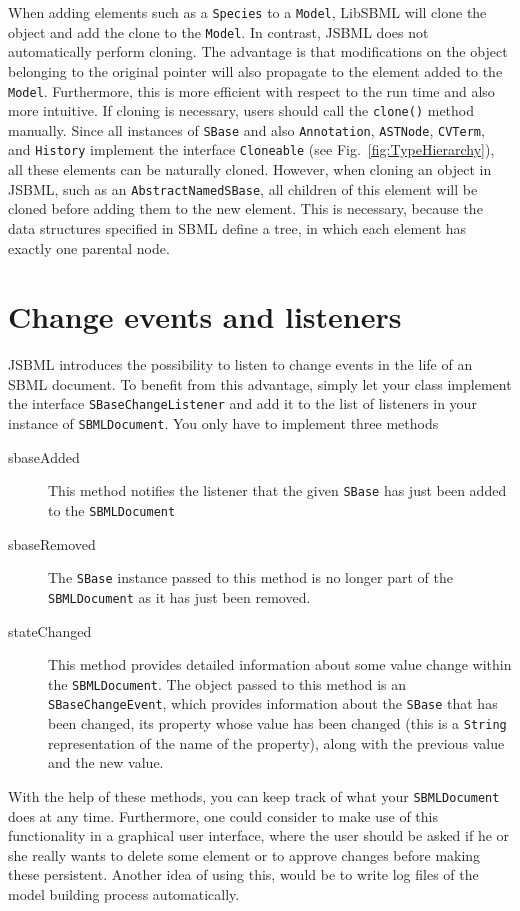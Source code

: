 \documentclass[
  BCOR12mm,
  letterpaper,
  11pt,
  headsepline,
  pointlessnumbers,
  tablecaptionabove,
  headinclude,
  appendixprefix,
  idxtotoc,
  bibtotoc,
  twoside,
  titlepage
]{scrartcl}
\begin{document}
When adding elements such as a \verb!Species! to a \verb!Model!, LibSBML will
clone the object and add the clone to the \verb!Model!. In contrast, JSBML does
not automatically perform cloning. The advantage is that modifications on the
object belonging to the original pointer will also propagate to the element
added to the \verb!Model!. Furthermore, this is more efficient with respect to
the run time and also more intuitive. If cloning is necessary, users should call
the \verb!clone()! method manually. Since all instances of \verb!SBase! and also
\verb!Annotation!, \verb!ASTNode!, \verb!CVTerm!, and \verb!History! implement
the interface \verb!Cloneable! (see Fig.~\vref{fig:TypeHierarchy}), all these
elements can be naturally cloned. However, when cloning an object in JSBML, such
as an \verb!AbstractNamedSBase!, all children of this element will be cloned
before adding them to the new element. This is necessary, because the data
structures specified in SBML define a tree, in which each element has exactly
one parental node.


\section{Change events and listeners}

JSBML introduces the possibility to listen to change events in the life of an
SBML document. To benefit from this advantage, simply let your class implement
the interface \verb!SBaseChangeListener! and add it to the list of listeners in
your instance of  \verb!SBMLDocument!. You only have to implement three methods
\begin{description}
 \item[sbaseAdded] This method notifies the listener that the given \verb!SBase!
   has just been added to the \verb!SBMLDocument!
 \item[sbaseRemoved] The \verb!SBase! instance passed to this method is no
   longer part of the \verb!SBMLDocument! as it has just been removed.
 \item[stateChanged] This method provides detailed information about some value
   change within the \verb!SBMLDocument!. The object passed to this method is
   an \verb!SBaseChangeEvent!, which provides information about the \verb!SBase!
   that has been changed, its property whose value has been changed (this is a
   \verb!String! representation of the name of the property), along with the
   previous value and the new value.
\end{description}
With the help of these methods, you can keep track of what your
\verb!SBMLDocument! does at any time. Furthermore, one could consider to make
use of this functionality in a graphical user interface, where the user should
be asked if he or she really wants to delete some element or to approve changes
before making these persistent. Another idea of using this, would be to write
log files of the model building process automatically.
\end{document}
